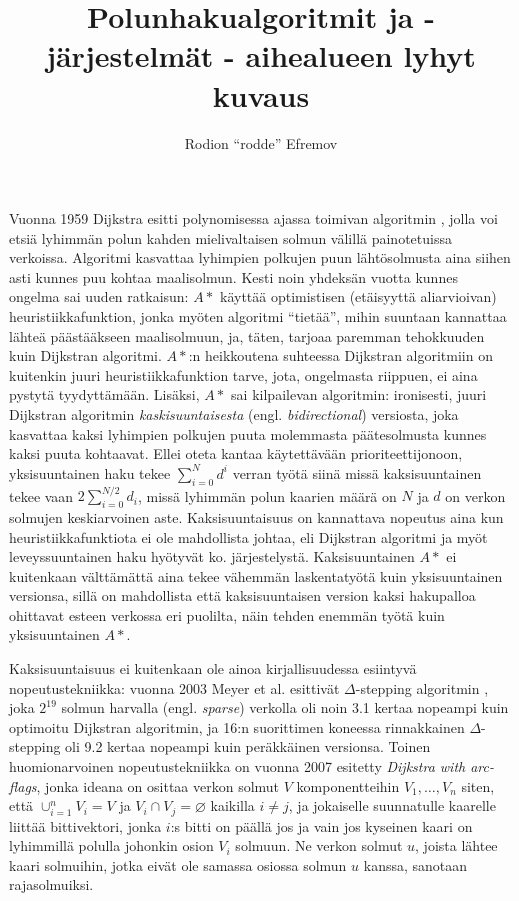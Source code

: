 \documentclass[10pt]{article}
\title{Polunhakualgoritmit ja -järjestelmät - aihealueen lyhyt kuvaus}
\author{Rodion ``rodde'' Efremov}
\begin{document}
 \maketitle
 
\noindent Vuonna 1959 Dijkstra esitti polynomisessa ajassa toimivan algoritmin \cite{Dijkstra59}, jolla voi etsiä lyhimmän polun kahden mielivaltaisen solmun välillä painotetuissa verkoissa. Algoritmi kasvattaa lyhimpien polkujen puun lähtösolmusta aina siihen asti kunnes puu kohtaa maalisolmun. Kesti noin yhdeksän vuotta kunnes ongelma sai uuden ratkaisun: $A\ast$ \cite{Hart68} käyttää optimistisen (etäisyyttä aliarvioivan) heuristiikkafunktion, jonka myöten algoritmi ``tietää'', mihin suuntaan kannattaa lähteä päästääkseen maalisolmuun, ja, täten, tarjoaa paremman tehokkuuden kuin Dijkstran algoritmi. $A\ast$:n heikkoutena suhteessa Dijkstran algoritmiin on kuitenkin juuri heuristiikkafunktion tarve, jota, ongelmasta riippuen, ei aina pystytä tyydyttämään. Lisäksi, $A\ast$ sai kilpailevan algoritmin: ironisesti, juuri Dijkstran algoritmin \textit{kaskisuuntaisesta} (engl. \textit{bidirectional}) versiosta, joka kasvattaa kaksi lyhimpien polkujen puuta molemmasta päätesolmusta kunnes kaksi puuta kohtaavat. Ellei oteta kantaa käytettävään prioriteettijonoon, yksisuuntainen haku tekee $\sum_{i = 0}^N d^i$ verran työtä siinä missä kaksisuuntainen tekee vaan $2\sum_{i = 0}^{N/2} d_i$, missä lyhimmän polun kaarien määrä on $N$ ja $d$ on verkon solmujen keskiarvoinen aste. Kaksisuuntaisuus on kannattava nopeutus aina kun heuristiikkafunktiota ei ole mahdollista johtaa, eli Dijkstran algoritmi ja myöt leveyssuuntainen haku hyötyvät ko. järjestelystä. Kaksisuuntainen $A\ast$ ei kuitenkaan välttämättä aina tekee vähemmän laskentatyötä kuin yksisuuntainen versionsa, sillä on mahdollista että kaksisuuntaisen version kaksi hakupalloa ohittavat esteen verkossa eri puolilta, näin tehden enemmän työtä kuin yksisuuntainen $A\ast$.
\vspace{0.5em}

\noindent Kaksisuuntaisuus ei kuitenkaan ole ainoa kirjallisuudessa esiintyvä nopeutustekniikka: vuonna 2003 Meyer et al. esittivät $\Delta$-stepping algoritmin \cite{Meyer98}, joka $2^{19}$ solmun harvalla (engl. \textit{sparse}) verkolla oli noin 3.1 kertaa nopeampi kuin optimoitu Dijkstran algoritmin, ja 16:n suorittimen koneessa rinnakkainen $\Delta$-stepping oli 9.2 kertaa nopeampi kuin peräkkäinen versionsa. Toinen huomionarvoinen nopeutustekniikka on vuonna 2007 esitetty \textit{Dijkstra with arc-flags}\cite{Mohring07}, jonka ideana on osittaa verkon solmut $V$ komponentteihin $V_1, \dots, V_n$ siten, että $\cup_{i = 1}^n V_i = V$ ja $V_i \cap V_j = \varnothing$ kaikilla $i \neq j$, ja jokaiselle suunnatulle kaarelle liittää bittivektori, jonka $i$:s bitti on päällä jos ja vain jos kyseinen kaari on lyhimmillä polulla johonkin osion $V_i$ solmuun. Ne verkon solmut $u$, joista lähtee kaari solmuihin, jotka eivät ole samassa osiossa solmun $u$ kanssa, sanotaan rajasolmuiksi. 



\end{document}
